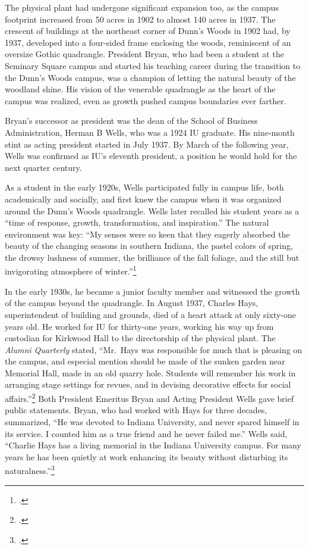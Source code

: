 \documentclass[
  american,
  letterpaper,
]{scrreprt}
\begin{document}
The physical plant had undergone significant expansion too, as the
campus footprint increased from 50 acres in 1902 to almost 140 acres in
1937. The crescent of buildings at the northeast corner of Dunn's Woods
in 1902 had, by 1937, developed into a four-sided frame enclosing the
woods, reminiscent of an oversize Gothic quadrangle. President Bryan,
who had been a student at the Seminary Square campus and started his
teaching career during the transition to the Dunn's Woods campus, was a
champion of letting the natural beauty of the woodland shine. His vision
of the venerable quadrangle as the heart of the campus was realized,
even as growth pushed campus boundaries ever farther.

Bryan's successor as president was the dean of the School of Business
Administration, Herman B Wells, who was a 1924 IU graduate. His
nine-month stint as acting president started in July 1937. By March of
the following year, Wells was confirmed as IU's eleventh president, a
position he would hold for the next quarter century.

As a student in the early 1920s, Wells participated fully in campus
life, both academically and socially, and first knew the campus when it
was organized around the Dunn's Woods quadrangle. Wells later recalled
his student years as a ``time of response, growth, transformation, and
inspiration.'' The natural environment was key: ``My senses were so keen
that they eagerly absorbed the beauty of the changing seasons in
southern Indiana, the pastel colors of spring, the drowsy lushness of
summer, the brilliance of the fall foliage, and the still but
invigorating atmosphere of winter.''\footnote{.}

In the early 1930s, he became a junior faculty member and witnessed the
growth of the campus beyond the quadrangle. In August 1937, Charles
Hays, superintendent of building and grounds, died of a heart attack at
only sixty-one years old. He worked for IU for thirty-one years, working
his way up from custodian for Kirkwood Hall to the directorship of the
physical plant. The \emph{Alumni Quarterly} stated, ``Mr.~Hays was
responsible for much that is pleasing on the campus, and especial
mention should be made of the sunken garden near Memorial Hall, made in
an old quarry hole. Students will remember his work in arranging stage
settings for revues, and in devising decorative effects for social
affairs.''\footnote{.} Both President Emeritus Bryan and Acting President Wells gave
brief public statements. Bryan, who had worked with Hays for three
decades, summarized, ``He was devoted to Indiana University, and never
spared himself in its service. I counted him as a true friend and he
never failed me.'' Wells said, ``Charlie Hays has a living memorial in
the Indiana University campus. For many years he has been quietly at
work enhancing its beauty without disturbing its
naturalness.''\footnote{.}
\end{document}
